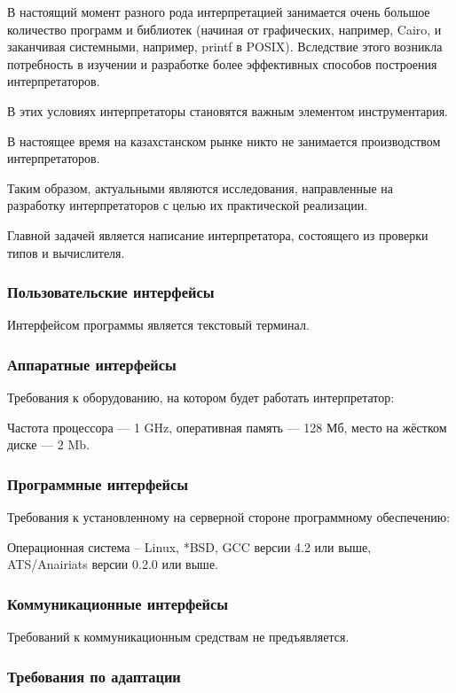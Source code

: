 В настоящий момент разного рода интерпретацией занимается очень большое количество программ и библиотек (начиная от графических, например, Cairo, и заканчивая системными, например, printf в POSIX). Вследствие этого возникла потребность в изучении и разработке более эффективных способов построения интерпретаторов.

В этих условиях интерпретаторы становятся важным элементом инструментария.

В настоящее время на казахстанском рынке никто не занимается производством интерпретаторов.

Таким образом, актуальными являются исследования, направленные на разработку интерпретаторов с целью их практической реализации. 

Главной задачей является написание интерпретатора, состоящего из проверки типов и вычислителя.

\subsubsection{Пользовательские интерфейсы}

Интерфейсом программы является текстовый терминал.

\subsubsection{Аппаратные интерфейсы}

Требования к оборудованию, на котором будет работать интерпретатор:
 
Частота процессора --- 1 GHz, оперативная память --- 128 Мб, место на жёстком диске --- 2 Mb.

\subsubsection{Программные интерфейсы}

Требования к установленному на серверной стороне программному обеспечению:

Операционная система – Linux, *BSD, GCC версии 4.2 или выше, ATS/Anairiats версии 0.2.0 или выше.

\subsubsection{Коммуникационные интерфейсы}

Требований к коммуникационным средствам не предъявляется.

\subsubsection{Требования по адаптации}


